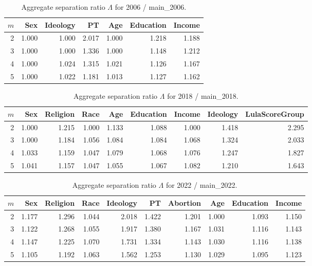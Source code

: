 
\begin{table}[!htbp]
\centering
\caption{Aggregate separation ratio $\Lambda$ for 2006 / main\_2006.}
\begin{tabular}{rrrrrrr}
\hline
$m$ & Sex & Ideology & PT & Age & Education & Income \\
\hline
2 & 1.000 & 1.000 & 2.017 & 1.000 & 1.218 & 1.188 \\
3 & 1.000 & 1.000 & 1.336 & 1.000 & 1.148 & 1.212 \\
4 & 1.000 & 1.024 & 1.315 & 1.021 & 1.126 & 1.167 \\
5 & 1.000 & 1.022 & 1.181 & 1.013 & 1.127 & 1.162 \\
\hline
\end{tabular}
\end{table}

\begin{table}[!htbp]
\centering
\caption{Aggregate separation ratio $\Lambda$ for 2018 / main\_2018.}
\begin{tabular}{rrrrrrrrr}
\hline
$m$ & Sex & Religion & Race & Age & Education & Income & Ideology & LulaScoreGroup \\
\hline
2 & 1.000 & 1.215 & 1.000 & 1.133 & 1.088 & 1.000 & 1.418 & 2.295 \\
3 & 1.000 & 1.184 & 1.056 & 1.084 & 1.084 & 1.068 & 1.324 & 2.033 \\
4 & 1.033 & 1.159 & 1.047 & 1.079 & 1.068 & 1.076 & 1.247 & 1.827 \\
5 & 1.041 & 1.157 & 1.047 & 1.055 & 1.067 & 1.082 & 1.210 & 1.643 \\
\hline
\end{tabular}
\end{table}

\begin{table}[!htbp]
\centering
\caption{Aggregate separation ratio $\Lambda$ for 2022 / main\_2022.}
\begin{tabular}{rrrrrrrrrr}
\hline
$m$ & Sex & Religion & Race & Ideology & PT & Abortion & Age & Education & Income \\
\hline
2 & 1.177 & 1.296 & 1.044 & 2.018 & 1.422 & 1.201 & 1.000 & 1.093 & 1.150 \\
3 & 1.122 & 1.268 & 1.055 & 1.917 & 1.380 & 1.167 & 1.031 & 1.116 & 1.143 \\
4 & 1.147 & 1.225 & 1.070 & 1.731 & 1.334 & 1.143 & 1.030 & 1.116 & 1.138 \\
5 & 1.105 & 1.192 & 1.063 & 1.562 & 1.253 & 1.130 & 1.029 & 1.095 & 1.123 \\
\hline
\end{tabular}
\end{table}

